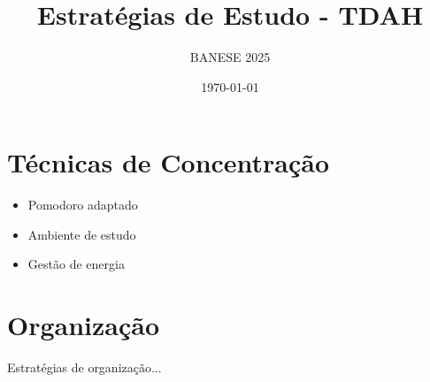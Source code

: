 \documentclass[12pt,a4paper]{article}
\title{Estratégias de Estudo - TDAH}
\author{BANESE 2025}
\date{\today}
\begin{document}
\maketitle

\section{Técnicas de Concentração}
\begin{itemize}
    \item Pomodoro adaptado
    \item Ambiente de estudo
    \item Gestão de energia
\end{itemize}

\section{Organização}
Estratégias de organização...
\end{document}
